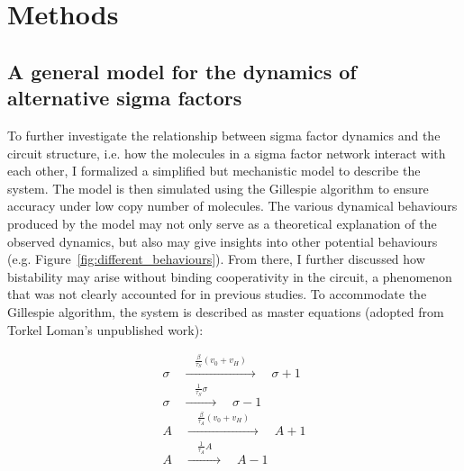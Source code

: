 
\chapter{Methods}

\ifpdf
    \graphicspath{{Chapter2/Figs/Raster/}{Chapter2/Figs/PDF/}{Chapter2/Figs/}{Figs}}
\else
    \graphicspath{{Chapter2/Figs/Vector/}{Chapter2/Figs/}{Figs}}
\fi

\section{A general model for the dynamics of alternative
 sigma factors}
\label{sec:low_CN}

To further investigate the relationship between sigma factor dynamics
and the circuit 
structure, i.e. how the molecules in a sigma factor network interact
with each other,
I formalized a simplified but mechanistic model to describe the system.
The model is then simulated using the Gillespie algorithm to ensure
accuracy under low copy number of molecules.
The various dynamical behaviours produced by the model may not only
serve as a theoretical explanation of the observed dynamics,
but also may give insights into other potential behaviours
(e.g. Figure~\ref{fig:different_behaviours}).
From there, I further discussed how bistability may arise without
binding cooperativity in the circuit,
a phenomenon that was not clearly accounted for in previous studies.
To accommodate the Gillespie algorithm, the system is described 
as master equations
(adopted from Torkel Loman's unpublished work):

\begin{equation}    %
\label{eqn:master_eqn}
\begin{gathered}    %
    \sigma\quad\xrightarrow{\quad \frac{\beta}{\tau_S}\left(
        v_0 + v_H\right)\quad}\quad\sigma + 1\\
    \sigma\quad\xrightarrow{\quad \frac{1}{\tau_S}\sigma \quad}
        \quad\sigma - 1\\
    A\quad\xrightarrow{\quad \frac{\beta}{\tau_A}\left(
        v_0 + v_H\right)\quad}\quad A + 1\\
    A\quad\xrightarrow{\quad \frac{1}{\tau_A}A \quad}\quad A - 1
\end{gathered}
\end{equation}


